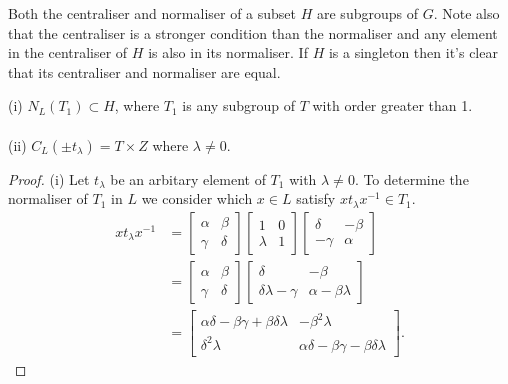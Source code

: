 Both the centraliser and normaliser of a subset $H$ are subgroups of $G$. Note also that the centraliser is a stronger condition than the normaliser and any element in the centraliser of $H$ is also in its normaliser. If $H$ is a singleton then it's clear that its centraliser and normaliser are equal.\\

\begin{proposition}\label{6.4i}
(i) $N_L(T_1) \subset H$, where $T_1$ is any subgroup of $T$ with order greater than 1. \\
\\
(ii) $C_L(\pm t_\lambda) = T \times Z$ where $\lambda \neq 0$.
\end{proposition}

\begin{proof} (i) Let $t_\lambda$ be an arbitary element of $T_1$ with $\lambda \neq 0$. To determine the normaliser of $T_1$ in $L$ we consider which $x \in L$ satisfy $x t_\lambda x^{-1} \in T_1$.
\begin{align*} x t_\lambda x^{-1} &= \begin{bmatrix} \alpha & \beta \\ \gamma & \delta \end{bmatrix} \begin{bmatrix} 1 & 0 \\ \lambda & 1 \end{bmatrix} \begin{bmatrix} \delta & \minus \beta \\ \minus \gamma & \alpha \end{bmatrix}
\\[1.5ex] &= \begin{bmatrix} \alpha & \beta \\ \gamma & \delta \end{bmatrix} \begin{bmatrix} \delta & \minus \beta \\ \delta \lambda - \gamma & \alpha - \beta \lambda \end{bmatrix}
\\[1.5ex] &= \begin{bmatrix} \alpha \delta - \beta \gamma + \beta \delta \lambda & \minus \beta^2  \lambda \\ \delta^2 \lambda & \alpha \delta - \beta \gamma - \beta \delta \lambda \end{bmatrix}.
\end{align*}


\end{proof}
